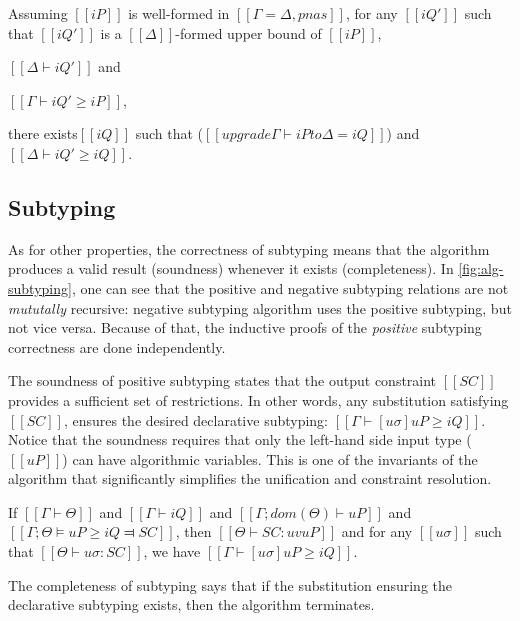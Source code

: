     \begin{lemma*}
        Assuming $[[iP]]$ is well-formed in $[[Γ = Δ, pnas]]$,
        for any $[[iQ']]$ such that $[[iQ']]$ is a $[[Δ]]$-formed upper bound of $[[iP]]$, \ie
        \begin{enumerate*}
            \item $[[Δ ⊢ iQ']]$ and
            \item $[[Γ ⊢ iQ' ≥ iP]]$,
        \end{enumerate*}
        there exists$[[iQ]]$ such that
        ($[[upgrade Γ ⊢ iP to Δ = iQ]]$) and $[[Δ ⊢ iQ' ≥ iQ]]$.
    \end{lemma*}

\subsection{Subtyping}
    \label{sec:proof-subtyping}

    As for other properties, the correctness of subtyping means that
    the algorithm produces a valid result (soundness) 
    whenever it exists (completeness).
    In \cref{fig:alg-subtyping}, one can see that the positive and 
    negative subtyping relations are not \emph{mututally} recursive: 
    negative subtyping algorithm uses the positive subtyping, 
    but not vice versa. 
    Because of that, the inductive proofs of the \emph{positive} subtyping correctness are done independently.

    The soundness of positive subtyping states that
    the output constraint $[[SC]]$ provides a sufficient set of restrictions.
    In other words, any substitution satisfying $[[SC]]$, 
    ensures the desired declarative subtyping: $[[Γ ⊢ [uσ]uP ≥ iQ]]$.
    Notice that the soundness requires that only the left-hand side input 
    type ($[[uP]]$) can have algorithmic variables. This is one of the invariants of the algorithm
    that significantly simplifies the unification and constraint resolution.

\begin{lemma*}
    If $[[Γ ⊢ Θ]]$ and $[[Γ ⊢ iQ]]$ and $[[Γ ; dom(Θ) ⊢  uP]]$ and 
    $[[Γ ; Θ ⊨ uP ≥ iQ ⫤ SC]]$,
    then $[[Θ ⊢ SC : uv uP]]$ and
    for any  $[[uσ]]$ such that $[[ Θ ⊢ uσ : SC ]]$,
    we have $[[ Γ ⊢ [uσ]uP ≥ iQ ]]$.
\end{lemma*}

    The completeness of subtyping says that if the substitution 
    ensuring the declarative subtyping exists, then the algorithm terminates.

